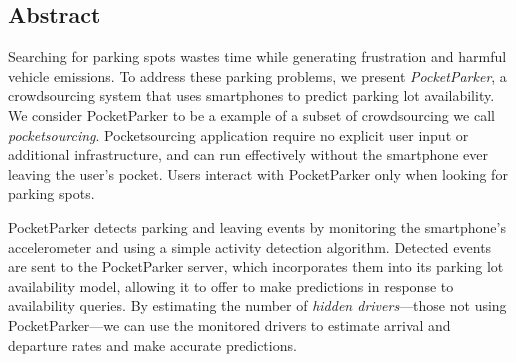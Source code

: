 \subsection*{Abstract}

Searching for parking spots wastes time while generating frustration and
harmful vehicle emissions. To address these parking problems, we present
\textit{PocketParker}, a crowdsourcing system that uses smartphones to
predict parking lot availability. We consider PocketParker to be a example of
a subset of crowdsourcing we call \textit{pocketsourcing}. Pocketsourcing
application require no explicit user input or additional infrastructure, and
can run effectively without the smartphone ever leaving the user's pocket.
Users interact with PocketParker only when looking for parking spots.

PocketParker detects parking and leaving events by monitoring the
smartphone's accelerometer and using a simple activity detection algorithm.
Detected events are sent to the PocketParker server, which incorporates them
into its parking lot availability model, allowing it to offer to make
predictions in response to availability queries. By estimating the number of
\textit{hidden drivers}---those not using PocketParker---we can use the
monitored drivers to estimate arrival and departure rates and make accurate
predictions.
